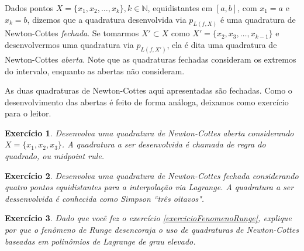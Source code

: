 \documentclass[]{article}
\newtheorem{exercicio}{Exercício}
\numberwithin{equation}{section}
\begin{document}
Dados pontos $X = \{x_1, x_2, \dots, x_k\}, k \in \mathbb{N}$,
equidistantes em $[a, b]$, com $x_1 = a$ e $x_k = b$, dizemos que a
quadratura desenvolvida via $p_{L(f, X)}$ é uma quadratura de
Newton-Cottes \emph{fechada}. Se tomarmos $X' \subset X$ como
$X' = \{x_2, x_3, \dots, x_{k - 1}\}$ e desenvolvermos uma quadratura
via $p_{L(f, X')}$, ela é dita uma quadratura de Newton-Cottes
\emph{aberta}. Note que as quadraturas fechadas consideram os extremos
do intervalo, enquanto as abertas não consideram.

As duas quadraturas de Newton-Cottes aqui apresentadas são
fechadas. Como o desenvolvimento das abertas é feito de forma análoga,
deixamos como exercício para o leitor.

\begin{exercicio}
  Desenvolva uma quadratura de Newton-Cottes aberta considerando
  $X = \{x_1, x_2, x_3\}$. A quadratura a ser desenvolvida é chamada
  de regra do quadrado, ou \emph{midpoint rule}.
\end{exercicio}

\begin{exercicio}
  Desenvolva uma quadratura de Newton-Cottes fechada considerando
  quatro pontos equidistantes para a interpolação via Lagrange. A
  quadratura a ser dessenvolvida é conhecida como Simpson ``três
  oitavos".
\end{exercicio}

\begin{exercicio}
  Dado que você fez o exercício \ref{exercicioFenomenoRunge}, explique
  por que o fenômeno de Runge desencoraja o uso de quadraturas de
  Newton-Cottes baseadas em polinômios de Lagrange de grau elevado.
\end{exercicio}
\end{document}

